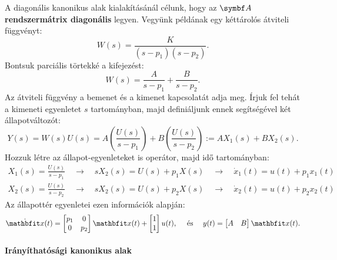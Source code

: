 A diagonális kanonikus alak kialakításánál célunk, hogy az $\rmat A$
\textbf{rendszermátrix diagonális} legyen. Vegyünk példának egy kéttárolós
átviteli függvényt:
\begin{equation}
  W(s) = \frac{K}{(s - p_1)(s- p_2)}.
\end{equation}
Bontsuk parciális törtekké a kifejezést:
\begin{equation}
  W(s) = \frac{A}{s - p_1} + \frac{B}{s - p_2}.
\end{equation}
Az átviteli függvény a bemenet és a kimenet kapcsolatát adja meg. Írjuk fel
tehát a kimeneti egyenletet $s$ tartományban, majd definiáljunk ennek
segítségével két állapotváltozót:
\begin{equation}
  Y(s)
  = W(s) U(s)
  = A \left( \frac{U(s)}{s - p_1} \right)
  + B \left( \frac{U(s)}{s - p_2} \right)
  := A X_1(s) + B X_2(s)
  .
\end{equation}
Hozzuk létre az állapot-egyenleteket is operátor, majd idő tartományban:
\begin{gather}
  X_1(s) = \frac{U(s)}{s - p_1}
  \quad \rightarrow \quad
  s X_2(s) = U(s) + p_1 X(s)
  \quad \rightarrow \quad
  \dot x_1(t) = u(t) + p_1 x_1(t)
  \\
  X_2(s) = \frac{U(s)}{s - p_2}
  \quad \rightarrow \quad
  s X_2(s) = U(s) + p_2 X(s)
  \quad \rightarrow \quad
  \dot x_2(t) = u(t) + p_2 x_2(t)
\end{gather}
Az állapottér egyenletei ezen információk alapján:
\begin{equation}
  \dot{\rvec x}(t) = \begin{bmatrix}
    p_1 & 0 \\ 0 & p_2
  \end{bmatrix} \rvec x(t) + \begin{bmatrix}
    1 \\ 1
  \end{bmatrix} u(t),
  \quad \text{ és } \quad
  y(t) = \begin{bmatrix}
    A & B
  \end{bmatrix} \rvec x(t).
\end{equation}

\paragraph{Irányíthatósági kanonikus alak}

